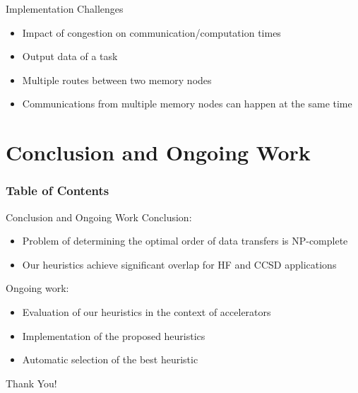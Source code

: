 \documentclass[mathserif,hyperref={pdfpagemode=FullScreen}]{beamer}
\begin{document}
\begin{frame}{Implementation Challenges}
\begin{itemize}
	\vfill
	\item Impact of congestion on communication/computation times
	\vfill
	\item Output data of a task
	\vfill
	\item Multiple routes between two memory nodes
	\vfill
	\item Communications from multiple memory nodes can happen at the same time
	\vfill
\end{itemize}
\end{frame}


 \section{Conclusion and Ongoing Work}
 \begin{frame}
\frametitle{Table of Contents}
\tableofcontents[currentsection]
\end{frame}
 \begin{frame}{Conclusion and Ongoing Work}
Conclusion:
 \begin{itemize}
  \item Problem of determining the optimal order of data transfers is NP-complete
  \item Our heuristics achieve significant overlap for HF and CCSD applications
 \end{itemize}
\vfill
Ongoing work: 
 \begin{itemize}
  \item Evaluation of our heuristics in the context of accelerators
  \item Implementation of the proposed heuristics
 \item Automatic selection of the best heuristic
 \end{itemize}
 \end{frame}


 \begin{frame}
  \begin{center}
   {\huge Thank \newline You!}
    
  \end{center}
 \end{frame}
\end{document}
